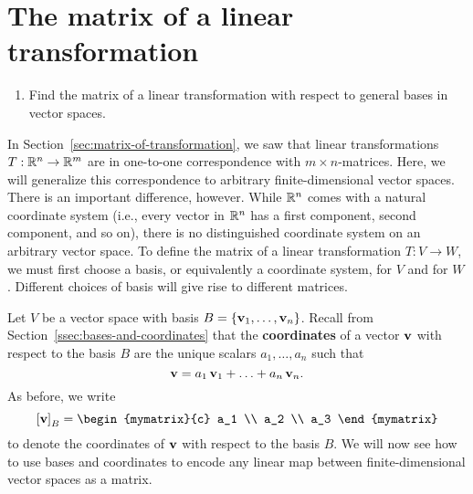 \section{The matrix of a linear transformation}

\begin{outcome}
  \begin{enumerate}
  \item Find the matrix of a linear transformation with respect to
    general bases in vector spaces.
  \end{enumerate}
\end{outcome}

In Section~\ref{sec:matrix-of-transformation}, we saw that linear
transformations $T:\mathbb{R}^n\to\mathbb{R}^m$ are in one-to-one correspondence with
$m\times n$-matrices. Here, we will generalize this correspondence to
arbitrary finite-dimensional vector spaces. There is an important
difference, however. While $\mathbb{R}^n$ comes with a natural coordinate
system (i.e., every vector in $\mathbb{R}^n$ has a first component, second
component, and so on), there is no distinguished coordinate system on
an arbitrary vector space. To define the matrix of a linear
transformation $T:V\to W$, we must first choose a basis, or
equivalently a coordinate system, for $V$ and for $W$. Different
choices of basis will give rise to different matrices.

Let $V$ be a vector space with basis
$B=\set{\vect{v}_1,\ldots,\vect{v}_n}$. Recall from
Section~\ref{ssec:bases-and-coordinates} that the \textbf{coordinates}
of a vector $\vect{v}$ with respect to the basis $B$%
%
 are the unique scalars
$a_1,\ldots,a_n$ such that
\begin{equation*}
  \vect{v} = a_1\,\vect{v}_1 + \ldots + a_n\,\vect{v}_n.
\end{equation*}
As before, we write
\begin{equation*}
  \coord{\vect{v}}_B = \begin{mymatrix}{c} a_1 \\ a_2 \\ a_3 \end{mymatrix}
\end{equation*}
to denote the coordinates of $\vect{v}$ with respect to the basis $B$.
We will now see how to use bases and coordinates to encode any linear
map between finite-dimensional vector spaces as a matrix. 

